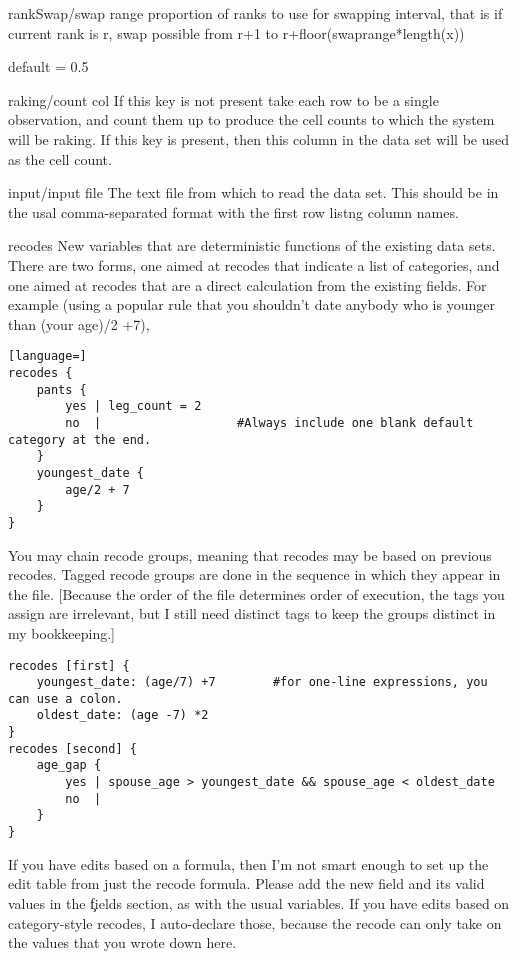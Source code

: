 \begin{key}{rankSwap/swap range}
 proportion of ranks to use for swapping interval, that is
if current rank is r, swap possible from r+1 to r+floor(swaprange*length(x))

default = 0.5

\end{key}

\begin{key}{raking/count col}
     If this key is not present take each row to be a
		single observation, and count them up to produce the cell counts to which the
		system will be raking. If this key is present, then this column in the data set
		will be used as the cell count.
\end{key}

\begin{key}{input/input file}
 The text file from which to read the data set. This should be in
the usal comma-separated format with the first row listng column names.
\end{key}

\begin{key}{recodes}
 New variables that are deterministic functions of the existing data sets.
There are two forms, one aimed at recodes that indicate a list of categories, and one
aimed at recodes that are a direct calculation from the existing fields.
For example (using a popular rule that you shouldn't date anybody who is younger than
(your age)/2 +7),
\begin{lstlisting}[language=]
recodes { 
    pants {
        yes | leg_count = 2
        no  |                   #Always include one blank default category at the end.
    }
    youngest_date {
        age/2 + 7
    }
}
\end{lstlisting}
You may chain recode groups, meaning that recodes may be based on previous recodes. Tagged
recode groups are done in the sequence in which they appear in the file. [Because the
order of the file determines order of execution, the tags you assign are irrelevant, but
I still need distinct tags to keep the groups distinct in my bookkeeping.]
\begin{lstlisting}
recodes [first] {
    youngest_date: (age/7) +7        #for one-line expressions, you can use a colon.
    oldest_date: (age -7) *2
}
recodes [second] {
    age_gap {
        yes | spouse_age > youngest_date && spouse_age < oldest_date
        no  | 
    }
}
\end{lstlisting}
If you have edits based on a formula, then I'm not smart enough to set up the edit table
from just the recode formula. Please add the new field and its valid values in the \c
fields section, as with the usual variables.
If you have edits based on category-style recodes, I auto-declare those, because the
recode can only take on the values that you wrote down here.
\end{key}


